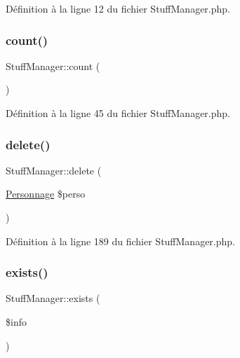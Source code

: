 Définition à la ligne 12 du fichier Stuff\+Manager.\+php.

\mbox{\label{class_stuff_manager_a140ab5d594414d8a71b0c8cee976b8de}} 
\subsubsection{\texorpdfstring{count()}{count()}}
{\footnotesize\ttfamily Stuff\+Manager\+::count (\begin{DoxyParamCaption}{ }\end{DoxyParamCaption})}



Définition à la ligne 45 du fichier Stuff\+Manager.\+php.

\mbox{\label{class_stuff_manager_a22e7e650bbf0cdb20d1c0c0871c9613f}} 
\subsubsection{\texorpdfstring{delete()}{delete()}}
{\footnotesize\ttfamily Stuff\+Manager\+::delete (\begin{DoxyParamCaption}\item[{\mbox{\hyperlink{class_personnage}{Personnage}}}]{\$perso }\end{DoxyParamCaption})}



Définition à la ligne 189 du fichier Stuff\+Manager.\+php.

\mbox{\label{class_stuff_manager_afc4490f2f57a541012ca5f66863b05fd}} 
\subsubsection{\texorpdfstring{exists()}{exists()}}
{\footnotesize\ttfamily Stuff\+Manager\+::exists (\begin{DoxyParamCaption}\item[{}]{\$info }\end{DoxyParamCaption})}



